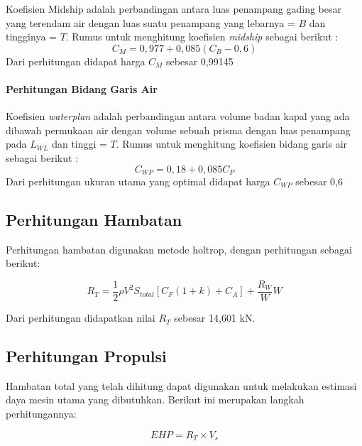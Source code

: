 Koefisien Midship adalah perbandingan antara luas penampang gading besar yang terendam air dengan luas suatu penampang yang lebarnya = $B$ dan tingginya = $T$. Rumus untuk menghitung koefisien \emph{midship} sebagai berikut \cite{Parsons_2001}:
\begin{equation}
    C_M = 0,977 + 0,085 (C_B - 0,6)
\end{equation}
Dari perhitungan didapat harga $C_M$ sebesar 0,99145

\paragraph{Perhitungan Bidang Garis Air}

Koefisien \emph{waterplan} adalah perbandingan antara volume badan kapal yang ada dibawah permukaan air dengan volume sebuah prisma dengan luas penampang pada $L_{WL}$ dan tinggi = $T$. Rumus untuk menghitung koefisien bidang garis air sebagai berikut \citep{Parsons_2001}:
\begin{equation}
    C_{WP} = 0,18 + 0,085 C_P
\end{equation}
Dari perhitungan ukuran utama yang optimal didapat harga $C_{WP}$ sebesar 0,6


\subsection{Perhitungan Hambatan}
\label{subsec:perhitungan-hambatan}

Perhitungan hambatan digunakan metode holtrop, dengan perhitungan sebagai berikut:

\begin{equation}
    R_T = \frac{1}{2}\rho V^{2}S_{total}[C_{F}\left(1+k\right)+ C_{A}]+ \frac{R_{W}}{W}W
\end{equation}

Dari perhitungan didapatkan nilai $R_T$ sebesar 14,601 kN.

\subsection{Perhitungan Propulsi}
\label{subsec:perhitungan-propulsi}

Hambatan total yang telah dihitung dapat digunakan untuk melakukan estimasi daya mesin utama yang dibutuhkan. Berikut ini merupakan langkah perhitungannya:

\begin{equation}
    EHP = R_T \times V_s
\end{equation}

